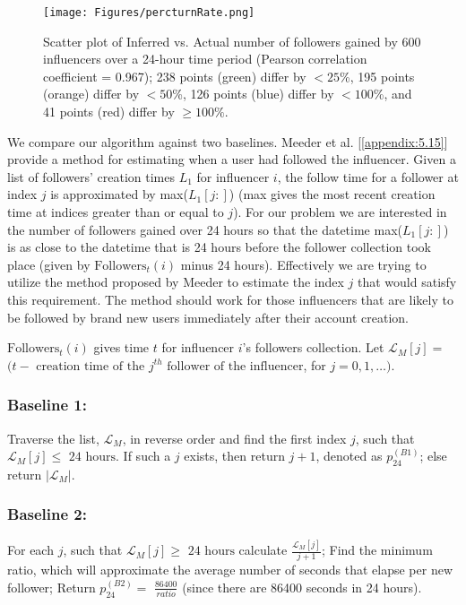 \begin{figure}[!t]
\centering
\texttt{[image: Figures/percturnRate.png]}
 \caption[Scatter plot of Inferred vs. Actual daily follower gain]{Scatter plot of Inferred vs. Actual number of followers gained by 600 influencers over a 24-hour time period (Pearson correlation coefficient = 0.967);  238 points (green) differ by  $<25$\%, 195 points (orange) differ by $<50$\%, 126 points (blue) differ by  $<100$\%, and 41 points (red) differ by $\geq100\%$.}
\label{fig_6N}
\end{figure}

We compare our algorithm against two baselines. Meeder et al. [\ref{appendix:5.15}] provide a method for estimating when a user had followed the influencer. Given a list of followers' creation times $L_1$ for influencer $i$, the follow time for a follower at index $j$ is approximated by max($L_1[j:]$) (max gives the most recent creation time at indices greater than or equal to $j$). For our problem we are interested in the number of followers gained over 24 hours so that the datetime max($L_1[j:]$) is as close to the datetime that is 24 hours before the follower collection took place (given by $\mbox{Followers}_t(i)$ minus 24 hours). Effectively we are trying to utilize the method proposed by Meeder to estimate the index $j$ that would satisfy this requirement. The method should work for those influencers that are likely to be followed by brand new users immediately after their account creation. 

$\mbox{Followers}_t(i)$ gives time $t$ for influencer $i$'s followers collection.  %
Let $\mathcal{L}_M[j] =$
$(t-\mbox{ creation time of the }   j^{th}  \mbox{ follower of the influencer}$, for $j = 0, 1,  \ldots)$. 

\subsubsection{Baseline 1:} Traverse the list, $\mathcal{L}_M$, in reverse order and find the first index $j$, such that $\mathcal{L}_M[j] \leq \mbox{ 24 hours}$. If such a $j$ exists, then return $j+1$, denoted as $p_{24}^{(B1)}$; else return $|\mathcal{L}_M|$. 

\subsubsection{Baseline 2:} For each $j$, such that $\mathcal{L}_M[j] \geq \mbox{ 24 hours}$ calculate $\frac{\mathcal{L}_M[j]}{j+1}$; Find the minimum ratio, which will approximate the average number of seconds that elapse per new follower; Return $p_{24}^{(B2)} =$ $\frac{86400}{ratio}$ (since there are 86400  seconds in 24 hours).

